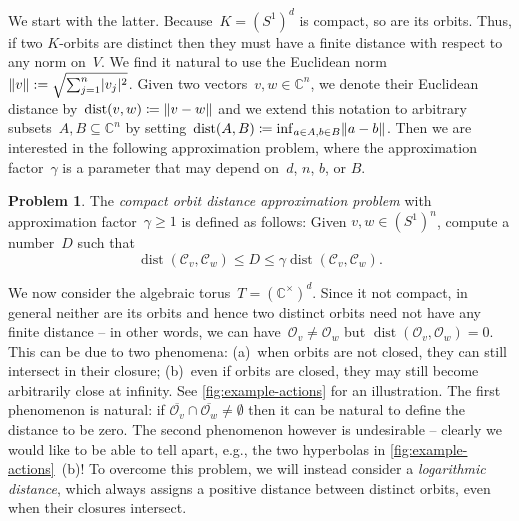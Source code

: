 \documentclass[10pt,a4paper]{article}
\theoremstyle{definition}
\newtheorem{problem}[theorem]{Problem}\crefname{problem}{Problem}{Problems}
\DeclareMathOperator{\dist}{dist}
\newcommand{\CC}{\mathbb{C}}
\newcommand{\OO}{\ensuremath{\mathcal{O}}}
\newcommand{\KK}{\ensuremath{\mathcal{C}}}
\DeclarePairedDelimiter\abs{\lvert}{\rvert}
\DeclarePairedDelimiter\norm{\lVert}{\rVert}
\numberwithin{equation}{section}
\begin{document}
We start with the latter.
Because~$K = (S^1)^d$ is compact, so are its orbits.
Thus, if two $K$-orbits are distinct then they must have a finite distance with respect to any norm on~$V$.
We find it natural to use the Euclidean norm~$\norm{v} := \sqrt{\sum_{j=1}^n \abs{v_j}^2}$.
Given two vectors~$v,w\in\CC^n$, we denote their Euclidean distance by~$\dist(v,w) \coloneqq \norm{v-w}$
and we extend this notation to arbitrary subsets~$A,B\subseteq\CC^n$
by setting~$\dist(A,B) \coloneqq \inf_{a\in A, b\in B} \norm{a-b}$.
Then we are interested in the following approximation problem,
where the approximation factor~$\gamma$ is a parameter that may depend on~$d$, $n$, $b$, or $B$.

\begin{problem}%
\label{prob:k-approx-dist}
The \emph{compact orbit distance approximation problem} with approximation factor~$\gamma\geq1$ is defined as follows:
Given $v,w\in (S^1)^n$, compute a number~$D$ such that
\[
 \dist(\KK_v,\KK_w) \le D \le \gamma \dist(\KK_v,\KK_w).
\]
\end{problem}

We now consider the algebraic torus~$T = (\CC^\times)^d$.
Since it not compact, in general neither are its orbits and hence two distinct orbits
need not have any finite distance -- in other words,
we can have~$\OO_v \neq \OO_w$ but $\dist(\OO_v, \OO_w) = 0$.
This can be due to two phenomena:
(a)~when orbits are not closed, they can still intersect in their closure;
(b)~even if orbits are closed, they may still become arbitrarily close at infinity.
See \cref{fig:example-actions} for an illustration.
The first phenomenon is natural:
if $\overline{\OO_v} \cap \overline{\OO_w} \neq \emptyset$
then it can be natural to define the distance to be zero.
The second phenomenon however is undesirable -- clearly we would like to be able to tell apart,
e.g., the two hyperbolas in \cref{fig:example-actions}~(b)! To overcome this problem, we will instead consider a \emph{logarithmic distance}, which always assigns a positive distance between distinct orbits, even when their closures intersect.
\end{document}
